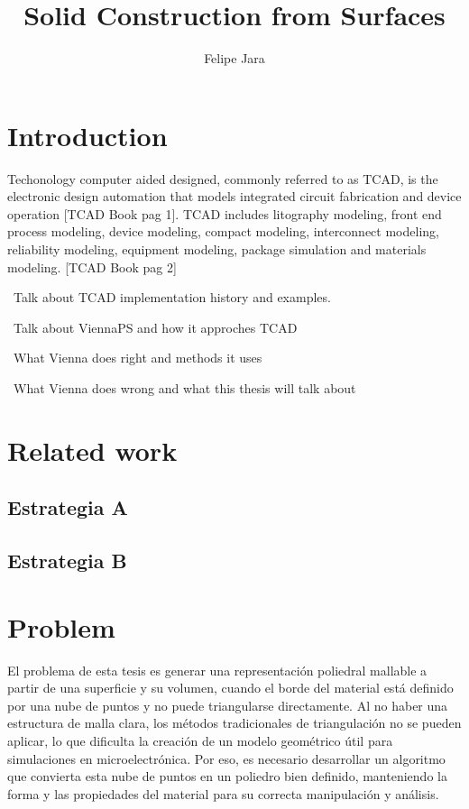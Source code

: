 \documentclass[submission]{eptcs}
\title{Solid Construction from Surfaces}
\author{ Felipe Jara
\institute{Department of Computer Science\\
University of Chile\\
Santiago, Chile}
\email{fjararibet@gmail.com}
}
\begin{document}
\maketitle

\section{Introduction}

Techonology computer aided designed, commonly referred to as TCAD, is the electronic design automation that models integrated circuit fabrication and device operation [TCAD Book pag 1]. TCAD includes litography modeling, front end process modeling, device modeling, compact modeling, interconnect modeling, reliability modeling, equipment modeling, package simulation and materials modeling. [TCAD Book pag 2]

~Talk about TCAD implementation history and examples.

~Talk about ViennaPS and how it approches TCAD

~What Vienna does right and methods it uses

~What Vienna does wrong and what this thesis will talk about

\section{Related work}



\subsection{ Estrategia  A}




\subsection{ Estrategia B}


\section{Problem}

El problema de esta tesis es generar una representación poliedral mallable a partir de una superficie y su volumen, cuando el borde del material está definido por una nube de puntos y no puede triangularse directamente. Al no haber una estructura de malla clara, los métodos tradicionales de triangulación no se pueden aplicar, lo que dificulta la creación de un modelo geométrico útil para simulaciones en microelectrónica. Por eso, es necesario desarrollar un algoritmo que convierta esta nube de puntos en un poliedro bien definido, manteniendo la forma y las propiedades del material para su correcta manipulación y análisis.
\end{document}
